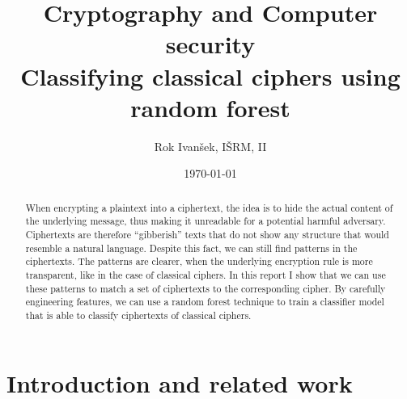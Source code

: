 \documentclass[a4paper]{article}
\title{Cryptography and Computer security\\
Classifying classical ciphers using random forest}
\author{Rok Ivanšek, IŠRM, II}
\date{\today}
\begin{document}
\maketitle


\begin{abstract}
When encrypting a plaintext into a ciphertext, the idea is to hide the actual content of the underlying message, thus making it unreadable for a potential harmful adversary. Ciphertexts are therefore ``gibberish'' texts that do not show any structure that would resemble a natural language. Despite this fact, we can still find patterns in the ciphertexts. The patterns are clearer, when the underlying encryption rule is more transparent, like in the case of classical ciphers. In this report I show that we can use these patterns to match a set of ciphertexts to the corresponding cipher. By carefully engineering features, we can use a random forest technique to train a classifier model that is able to classify ciphertexts of classical ciphers.
\end{abstract}

\section{Introduction and related work}
\end{document}
